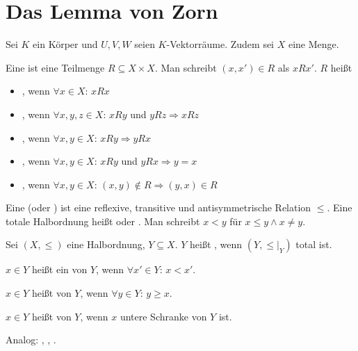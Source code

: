 \section{Das Lemma von Zorn}

Sei $K$ ein Körper und $U,V,W$ seien $K$-Vektorräume. Zudem sei $X$ eine Menge.

\begin{definition}[Relation]
	Eine  ist eine Teilmenge $R\subseteq X\times X$. Man schreibt $(x,x')\in R$ als $xRx'$. $R$ heißt
	\begin{itemize}
		\item {}, wenn $\forall  x\in X$: $xRx$
		\item {}, wenn $\forall x,y,z\in X$: $xRy$ und $yRz\Rightarrow xRz$
		\item {}, wenn $\forall x,y\in X$: $xRy\Rightarrow yRx$
		\item {}, wenn $\forall x,y\in X$: $xRy$ und $yRx\Rightarrow y=x$
		\item {}, wenn $\forall x,y\in X$: $(x,y)\notin R\Rightarrow (y,x)\in R$
	\end{itemize}
\end{definition}

\begin{definition}[Halbordnung]
	Eine  (oder ) ist eine reflexive, transitive und antisymmetrische Relation $\le$. Eine totale Halbordnung heißt  oder . Man schreibt $x<y$ für $x\le y\land x\neq y$.
\end{definition}

\begin{definition}[Kette]
	Sei $(X,\le)$ eine Halbordnung, $Y\subseteq X$. $Y$ heißt , wenn $(Y,\le\vert_Y)$ total ist.
	
	$x\in Y$ heißt ein  von $Y$, wenn $\forall x'\in Y$: $x<x'$.
	
	$x\in Y$ heißt  von $Y$, wenn $\forall y\in Y$: $y\ge x$.
	
	$x\in Y$ heißt  von $Y$, wenn $x$ untere Schranke von $Y$ ist.
	
	Analog: , , .
\end{definition}

